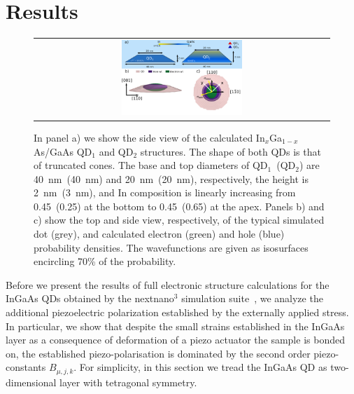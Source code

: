 \documentclass[aps,prl,amsmath,amssymb,twocolumn,showpacs,showkeys,superscriptaddress]{revtex4-1}
\begin{document}
\section{Results}

\begin{figure}[!ht]
\renewcommand{\tabcolsep}{2pt}
\begin{center}
\begin{tabular}{c}
\includegraphics[width=0.42\textwidth]{180204_structura_wo-gradient_w_triangles_and_wfuncions_vs5.eps} \\ 
\end{tabular}
\end{center}
\caption{In panel a) we show the side view of the calculated In$_{{x}}$Ga$_{1-x}$As/GaAs QD$_1$ and QD$_2$ structures. The shape of both QDs is that of truncated cones. The base and top diameters of QD$_1$~(QD$_2$) are 40~nm~(40~nm) and 20~nm~(20~nm), respectively, the height is 2~nm~(3~nm), and In composition is linearly increasing from 0.45~(0.25) at the bottom to 0.45~(0.65) at the apex. Panels b) and c) show the top and side view, respectively, of the typical simulated dot (grey), and calculated electron (green) and hole (blue) probability densities. The wavefunctions are
given as isosurfaces encircling 70\% of the probability.
\label{fig:QDStruct}}
\end{figure}


Before we present the results of full electronic structure calculations for the InGaAs QDs obtained by the nextnano$^3$ simulation suite~\cite{Birner:07}, we analyze the additional piezoelectric polarization established by the externally applied stress. In particular, we show that despite the small strains established in the InGaAs layer as a consequence of deformation of a piezo actuator the sample is bonded on, the established piezo-polarisation is dominated by the second order piezo-constants $B_{\mu,j,k}$. For simplicity, in this section we tread the InGaAs QD as two-dimensional layer with tetragonal symmetry.    
\end{document}

